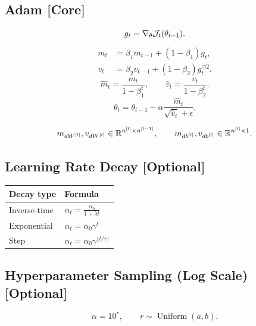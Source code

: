 \subsection{Adam \textbf{[Core]}}

\[
g_t = \nabla_{\theta}\mathcal{J}_t(\theta_{t-1}).
\]
\[
\begin{aligned}
m_t
&=
\beta_1 m_{t-1}
+
(1-\beta_1)g_t,\\
v_t
&=
\beta_2 v_{t-1}
+
(1-\beta_2)g_t^{\odot 2}.
\end{aligned}
\]
\[
\hat{m}_t
=
\frac{m_t}{1-\beta_1^t},
\qquad
\hat{v}_t
=
\frac{v_t}{1-\beta_2^t}.
\]
\[
\theta_t
=
\theta_{t-1}
-
\alpha
\frac{\hat{m}_t}{\sqrt{\hat{v}_t}+\epsilon}.
\]

\[
m_{dW^{[l]}}, v_{dW^{[l]}}
\in
\mathbb{R}^{n^{[l]} \times n^{[l-1]}},
\qquad
m_{db^{[l]}}, v_{db^{[l]}}
\in
\mathbb{R}^{n^{[l]} \times 1}.
\]

\subsection{Learning Rate Decay \textbf{[Optional]}}

\begin{center}
\begin{tabular}{ll}
\toprule
Decay type & Formula \\
\midrule
Inverse-time &
\(\displaystyle \alpha_t=\frac{\alpha_0}{1+\lambda t}\) \\
\addlinespace
Exponential &
\(\displaystyle \alpha_t=\alpha_0\gamma^t\) \\
\addlinespace
Step &
\(\displaystyle \alpha_t=\alpha_0\gamma^{\lfloor t/r \rfloor}\) \\
\bottomrule
\end{tabular}
\end{center}

\subsection{Hyperparameter Sampling (Log Scale) \textbf{[Optional]}}

\[
\alpha = 10^r,
\qquad
r \sim \operatorname{Uniform}(a,b).
\]

